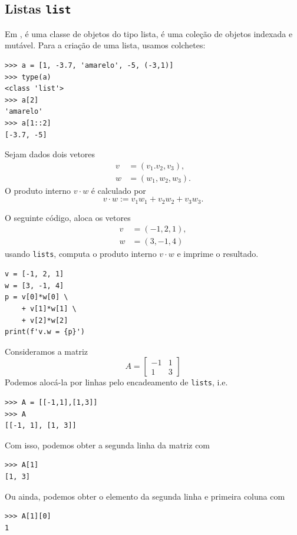 \subsection{Listas \texttt{list}}

Em {\python}, {\PYTHONlist} é uma classe de objetos do tipo lista, é uma coleção de objetos indexada e mutável. Para a criação de uma lista, usamos colchetes:

\begin{lstlisting}
>>> a = [1, -3.7, 'amarelo', -5, (-3,1)] 
>>> type(a)
<class 'list'>
>>> a[2]
'amarelo'
>>> a[1::2]
[-3.7, -5]
\end{lstlisting}

\begin{ex}
  Sejam dados dois vetores
  \begin{align}
    v &= (v_1. v_2, v_3),\\
    w &= (w_1, w_2, w_3).
  \end{align}
  O produto interno $v\cdot w$ é calculado por
  \begin{equation}
    v\cdot w := v_1w_1 + v_2w_2 + v_3w_3.
  \end{equation}

  O seguinte código, aloca os vetores
  \begin{align}
    v &= (-1, 2, 1),\\
    w &= (3, -1, 4)
  \end{align}
  usando \texttt{lists}, computa o produto interno $v\cdot w$ e imprime o resultado.

\begin{lstlisting}
v = [-1, 2, 1]
w = [3, -1, 4]
p = v[0]*w[0] \
    + v[1]*w[1] \
    + v[2]*w[2]
print(f'v.w = {p}')
\end{lstlisting}

\end{ex}

\begin{ex}
  Consideramos a matriz
  \begin{equation}
    A =
    \begin{bmatrix}
      -1 & 1 \\
      1 & 3 
    \end{bmatrix}
  \end{equation}
  Podemos alocá-la por linhas pelo encadeamento de \texttt{lists}, i.e.

\begin{lstlisting}
>>> A = [[-1,1],[1,3]]
>>> A
[[-1, 1], [1, 3]]
\end{lstlisting}

Com isso, podemos obter a segunda linha da matriz com

\begin{lstlisting}
>>> A[1]
[1, 3]
\end{lstlisting}

Ou ainda, podemos obter o elemento da segunda linha  e primeira coluna com

\begin{lstlisting}
>>> A[1][0]
1
\end{lstlisting}

\end{ex}


